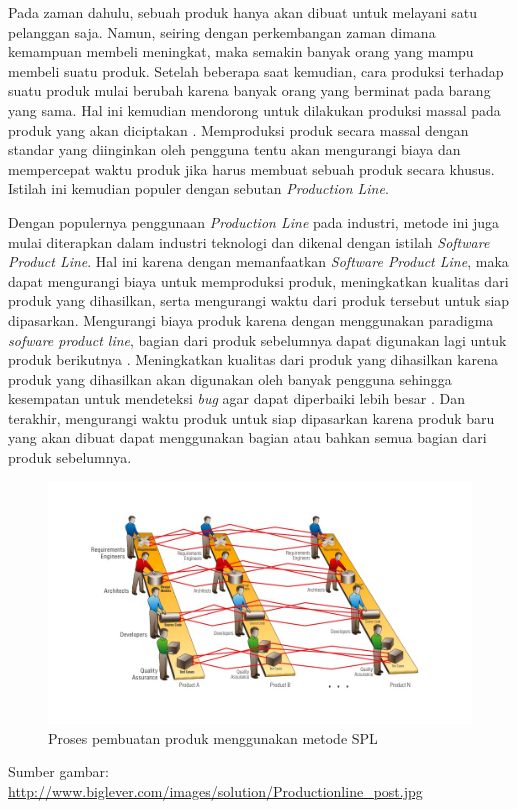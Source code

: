 Pada zaman dahulu, sebuah produk hanya akan dibuat untuk melayani satu pelanggan saja. Namun, seiring dengan perkembangan zaman dimana kemampuan membeli meningkat, maka semakin banyak orang yang mampu membeli suatu produk. Setelah beberapa saat kemudian, cara produksi terhadap suatu produk mulai berubah karena banyak orang yang berminat pada barang yang sama. Hal ini kemudian mendorong untuk dilakukan produksi massal pada produk yang akan diciptakan \citep{book.sple}. Memproduksi produk secara massal dengan standar yang diinginkan oleh pengguna tentu akan mengurangi biaya dan mempercepat waktu produk jika harus membuat sebuah produk secara khusus. Istilah ini kemudian populer dengan sebutan \textit{Production Line}.
	
Dengan populernya penggunaan \textit{Production Line} pada industri, metode ini juga mulai diterapkan dalam industri teknologi dan dikenal dengan istilah \textit{Software Product Line}. Hal ini karena dengan memanfaatkan \textit{Software Product Line}, maka dapat mengurangi biaya untuk memproduksi produk, meningkatkan kualitas dari produk yang dihasilkan, serta mengurangi waktu dari produk tersebut untuk siap dipasarkan. Mengurangi biaya produk karena dengan menggunakan paradigma \textit{sofware product line}, bagian dari produk sebelumnya dapat digunakan lagi untuk produk berikutnya \citep{book.sple}. Meningkatkan kualitas dari produk yang dihasilkan karena produk yang dihasilkan akan digunakan oleh banyak pengguna sehingga kesempatan untuk mendeteksi \textit{bug} agar dapat diperbaiki lebih besar \citep{book.sple}. Dan terakhir, mengurangi waktu produk untuk siap dipasarkan karena produk baru yang akan dibuat dapat menggunakan bagian atau bahkan semua bagian dari produk sebelumnya.

\begin{figure}
	\centering
	\includegraphics[width=1.1\textwidth]
	{pics/spl.jpg}
	\caption{Proses pembuatan produk menggunakan metode SPL}
	\label{fig:spl}
\end{figure}
\vspace{-0.8cm}
\begin{center}
	{\small Sumber gambar: \url{http://www.biglever.com/images/solution/Productionline_post.jpg}}
\end{center}

